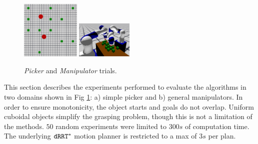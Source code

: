 %

\begin{figure}
    \vspace{-.6in}
	\centering
		\includegraphics[width=1.1in,trim={1cm 9cm 1cm 5cm},clip]{figures/simple_picker_benchmark}
		\includegraphics[width=1.05in]{figures/kuka_benchmark2}
		\vspace{-.3in}
		\caption{\textit{Picker} and \textit{Manipulator} trials.}
		\label{fig:benchmarks}
    \vspace{-.3in}
\end{figure}
This section describes the experiments performed to evaluate the algorithms in two  domains shown in Fig \ref{fig:benchmarks}: a) simple picker and b) general manipulators.
In order to ensure monotonicity, the object starts and goals do not overlap. Uniform cuboidal objects simplify the grasping problem, though this is not a limitation of the methods. $ 50 $ random experiments were limited to $300s$ of computation time. The underlying $ {\tt dRRT^*} $ motion planner is restricted to a max of $ 3s $ per plan.
